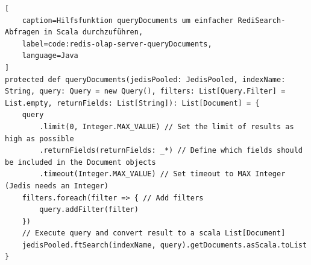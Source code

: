\begin{lstlisting}[
    caption=Hilfsfunktion queryDocuments um einfacher RediSearch-Abfragen in Scala durchzuführen,
    label=code:redis-olap-server-queryDocuments,
    language=Java
]
protected def queryDocuments(jedisPooled: JedisPooled, indexName: String, query: Query = new Query(), filters: List[Query.Filter] = List.empty, returnFields: List[String]): List[Document] = {
	query
		.limit(0, Integer.MAX_VALUE) // Set the limit of results as high as possible
		.returnFields(returnFields: _*) // Define which fields should be included in the Document objects
		.timeout(Integer.MAX_VALUE) // Set timeout to MAX Integer (Jedis needs an Integer)
	filters.foreach(filter => { // Add filters
		query.addFilter(filter)
	})
	// Execute query and convert result to a scala List[Document]
	jedisPooled.ftSearch(indexName, query).getDocuments.asScala.toList
}
\end{lstlisting}


